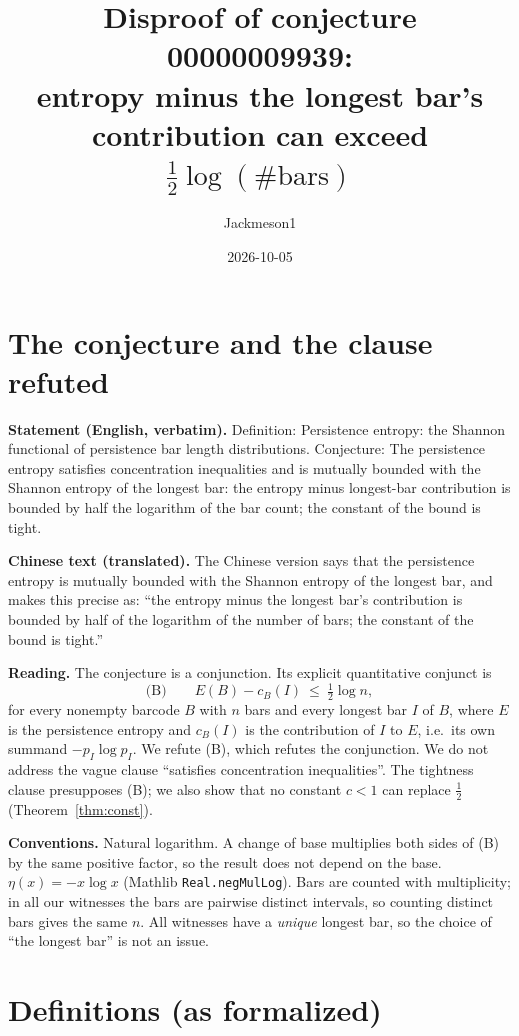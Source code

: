 \documentclass[11pt]{article}
\title{Disproof of conjecture 00000009939:\\ entropy minus the longest bar's contribution can exceed $\tfrac12\log(\#\text{bars})$}
\author{Jackmeson1}
\date{2026-10-05}
\theoremstyle{definition}
\theoremstyle{remark}
\newcommand{\nml}{\eta}
\begin{document}
\maketitle

\section{The conjecture and the clause refuted}

\textbf{Statement (English, verbatim).} Definition: Persistence entropy: the Shannon functional of
persistence bar length distributions. Conjecture: The persistence entropy satisfies concentration
inequalities and is mutually bounded with the Shannon entropy of the longest bar: the entropy minus
longest-bar contribution is bounded by half the logarithm of the bar count; the constant of the bound
is tight.

\textbf{Chinese text (translated).} The Chinese version says that the persistence entropy is
mutually bounded with the Shannon entropy of the longest bar, and makes this precise as: ``the
entropy minus the longest bar's contribution is bounded by half of the logarithm of the number of
bars; the constant of the bound is tight.''

\textbf{Reading.} The conjecture is a conjunction. Its explicit quantitative conjunct is
\[
  \text{(B)}\qquad E(B)-c_B(I)\ \le\ \tfrac12\log n,
\]
for every nonempty barcode $B$ with $n$ bars and every longest bar $I$ of $B$,
where $E$ is the persistence entropy and $c_B(I)$ is the contribution of $I$ to $E$, i.e.\ its own
summand $-p_I\log p_I$. We refute (B), which refutes the conjunction. We do not address the vague
clause ``satisfies concentration inequalities''. The tightness clause presupposes (B); we also show
that no constant $c<1$ can replace $\tfrac12$ (Theorem~\ref{thm:const}).

\textbf{Conventions.} Natural logarithm. A change of base multiplies both sides of (B) by the same
positive factor, so the result does not depend on the base. $\nml(x)=-x\log x$ (Mathlib
\texttt{Real.negMulLog}). Bars are counted with multiplicity; in all our witnesses the bars are
pairwise distinct intervals, so counting distinct bars gives the same $n$. All witnesses have a
\emph{unique} longest bar, so the choice of ``the longest bar'' is not an issue.

\section{Definitions (as formalized)}
\end{document}
